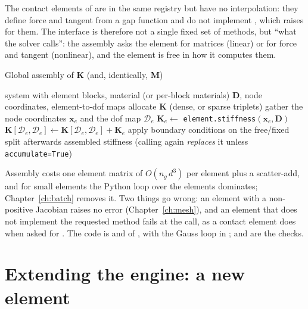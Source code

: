 The contact elements of \fea{} are in the same registry but have no interpolation: they define force and tangent from a gap function and do not implement , which raises  for them. The interface is therefore not a single fixed set of methods, but ``what the solver calls'': the assembly asks the element for matrices (linear) or for force and tangent (nonlinear), and the element is free in how it computes them.


\begin{algbox}{Global assembly of $\bm K$ (and, identically, $\bm M$)}
\begin{pseudo}
\Require system with element blocks, material (or per-block materials) $\bm D$, node coordinates, element-to-dof maps
\State allocate $\bm K$ (dense, or sparse triplets)
  \State gather the node coordinates $\bm x_e$ and the dof map $\mathcal D_e$
  \State $\bm K_e\gets$ \texttt{element.stiffness}$(\bm x_e,\bm D)$ 
  \State $\bm K[\mathcal D_e,\mathcal D_e]\gets\bm K[\mathcal D_e,\mathcal D_e]+\bm K_e$
\EndFor
\State apply boundary conditions on the free/fixed split afterwards
\Ensure assembled stiffness (calling again \emph{replaces} it unless \texttt{accumulate=True})
\end{pseudo}
\end{algbox}

Assembly costs one element matrix of $O(n_g\,d^3)$ per element plus a scatter-add, and for small elements the Python loop over the elements dominates; Chapter~\ref{ch:batch} removes it. Two things go wrong: an element with a non-positive Jacobian raises no error (Chapter~\ref{ch:mesh}), and an element that does not implement the requested method fails at the call, as a contact element does when asked for . The code is  and  of , with the Gauss loop in ;  and  are the checks.

\section{Extending the engine: a new element}\label{sec:ar-extend}

